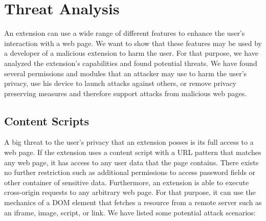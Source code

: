 
\chapter{Threat Analysis}

	An extension can use a wide range of different features to enhance the user's interaction with a web page. We want to show that these features may be used by a developer of a malicious extension to harm the user. For that purpose, we have analyzed the extension's capabilities and found potential threats. We have found several permissions and modules that an attacker may use to harm the user's privacy, use his device to launch attacks against others, or remove privacy preserving measures and therefore support attacks from malicious web pages.  

\section{Content Scripts}

	A big threat to the user's privacy that an extension posses is its full access to a web page. If the extension uses a content script with a URL pattern that matches any web page, it has access to any user data that the page contains. There exists no further restriction such as additional permissions to access password fields or other container of sensitive data. Furthermore, an extension is able to execute cross-origin requests to any arbitrary web page. For that purpose, it can use the mechanics of a DOM element that fetches a resource from a remote server such as an iframe, image, script, or link. We have listed some potential attack scenarios:
	
